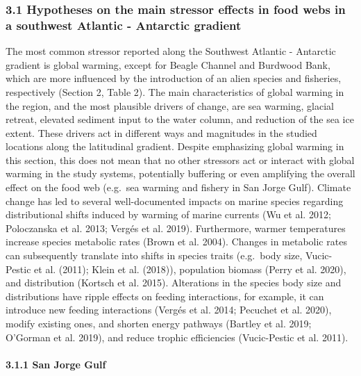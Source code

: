 \documentclass[
]{article}
\begin{document}
\normalsize

\subsubsection{3.1 Hypotheses on the main stressor effects in food webs
in a southwest Atlantic - Antarctic
gradient}\label{hypotheses-on-the-main-stressor-effects-in-food-webs-in-a-southwest-atlantic---antarctic-gradient}

The most common stressor reported along the Southwest Atlantic -
Antarctic gradient is global warming, except for Beagle Channel and
Burdwood Bank, which are more influenced by the introduction of an alien
species and fisheries, respectively (Section 2, Table 2). The main
characteristics of global warming in the region, and the most plausible
drivers of change, are sea warming, glacial retreat, elevated sediment
input to the water column, and reduction of the sea ice extent. These
drivers act in different ways and magnitudes in the studied locations
along the latitudinal gradient. Despite emphasizing global warming in
this section, this does not mean that no other stressors act or interact
with global warming in the study systems, potentially buffering or even
amplifying the overall effect on the food web (e.g.~sea warming and
fishery in San Jorge Gulf). Climate change has led to several
well-documented impacts on marine species regarding distributional
shifts induced by warming of marine currents (Wu et al. 2012;
Poloczanska et al. 2013; Vergés et al. 2019). Furthermore, warmer
temperatures increase species metabolic rates (Brown et al. 2004).
Changes in metabolic rates can subsequently translate into shifts in
species traits (e.g.~body size, Vucic-Pestic et al. (2011); Klein et al.
(2018)), population biomass (Perry et al. 2020), and distribution
(Kortsch et al. 2015). Alterations in the species body size and
distributions have ripple effects on feeding interactions, for example,
it can introduce new feeding interactions (Vergés et al. 2014; Pecuchet
et al. 2020), modify existing ones, and shorten energy pathways (Bartley
et al. 2019; O'Gorman et al. 2019), and reduce trophic efficiencies
(Vucic-Pestic et al. 2011).

\paragraph{3.1.1 San Jorge Gulf}\label{san-jorge-gulf-1}
\end{document}
